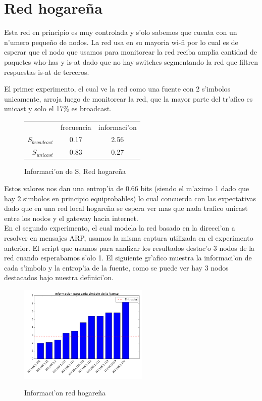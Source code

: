 \section{Red hogare\~na}
Esta red en principio es muy controlada y s'olo sabemos que cuenta con un n'umero peque\~no de nodos. La red usa
en su mayoria wi-fi por lo cual es de esperar que el nodo que usamos para monitorear la red reciba amplia cantidad de
paquetes who-has y is-at dado que no hay switches segmentando la red que filtren respuestas is-at de terceros.

El primer experimento, el cual ve la red como una fuente con 2 s'imbolos unicamente, arroja luego de monitorear la red,
que la mayor parte del tr'afico es unicast y solo el 17\% es broadcast.\\

\begin{figure}[!h]
\centering
\caption{Informaci'on de S, Red hogare\~na}
\begin{tabular}{ r|c|c| }
\multicolumn{1}{r}{}
 &  \multicolumn{1}{c}{frecuencia}
 & \multicolumn{1}{c}{informaci'on} \\
\cline{2-3}
$S_{broadcast}$ & 0.17 & 2.56 \\
\cline{2-3}
$S_{unicast}$ & 0.83 & 0.27 \\
\cline{2-3}
\end{tabular}
\end{figure}
 
Estos valores nos dan una entrop'ia de 0.66 bits (siendo el m'aximo 1 dado que hay 2 simbolos en principio equiprobables) lo
 cual concuerda con las expectativas dado que en una red local hogare\~na se espera ver mas que nada trafico unicast entre
 los nodos y el gateway hacia internet.\\
 
En el segundo experimento, el cual modela la red basado en la direcci'on a resolver en mensajes ARP, usamos la misma captura
utilizada en el experimento anterior. El script que usamos para analizar los resultados destac'o 3 nodos de la red cuando
esperabamos s'olo 1. El siguiente gr'afico muestra la informaci'on de cada s'imbolo y la entrop'ia de la fuente, como se puede
ver hay 3 nodos destacados bajo nuestra definici'on.\\
 
\begin{figure}[!h]
\centering
\caption{Informaci'on red hogare\~na}
\includegraphics[width=0.55\textwidth]{red1_info}
 \label{fig:red1info}
\end{figure}

